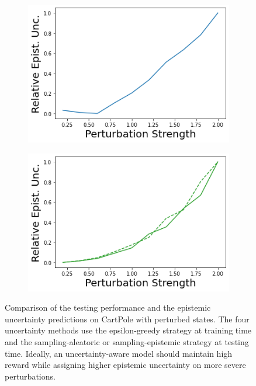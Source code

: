 \begin{figure}
\begin{subfigure}{.24\textwidth}
        \includegraphics[width=\textwidth]{sections/011_icml2022/resources/state_shift-DKL-CartPoleShift-v0-mean_epistemic_uncertainty_.png}
    \end{subfigure}
    \begin{subfigure}{.24\textwidth}
        \includegraphics[width=\textwidth]{sections/011_icml2022/resources/state_shift-PostNet-CartPoleShift-v0-mean_epistemic_uncertainty_.png}
    \end{subfigure}
        \vspace{-2mm}
    \caption{Comparison of the testing performance and the epistemic uncertainty predictions on CartPole with perturbed states. The four uncertainty methods use the epsilon-greedy strategy at training time and the sampling-aleatoric or sampling-epistemic strategy at testing time. Ideally, an uncertainty-aware model should maintain high reward while assigning higher epistemic uncertainty on more severe perturbations.}
    \label{fig:strategy-state-shift-testing-performance-cartpole}
        \vspace{-6mm}
\end{figure}